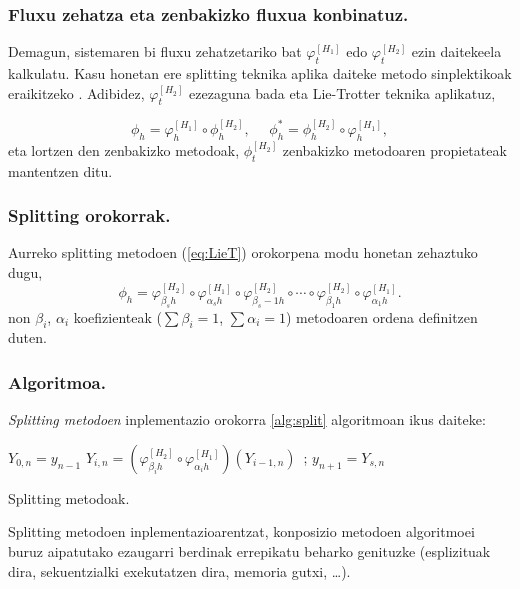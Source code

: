 \subsubsection*{Fluxu zehatza eta zenbakizko fluxua konbinatuz.}
Demagun, sistemaren bi fluxu zehatzetariko bat $\varphi_t^{[H_1]}$ edo $\varphi_t^{[H_2]}$ ezin daitekeela kalkulatu. Kasu honetan ere splitting teknika aplika daiteke  metodo sinplektikoak eraikitzeko . Adibidez, $\varphi_t^{[H_2]}$ ezezaguna bada eta Lie-Trotter teknika aplikatuz,

\begin{equation*}
\phi_h=\varphi_h^{[H_1]} \circ \phi_h^{[H_2]}, \ \ \ \ \ \  \phi_h^{*}=\phi_h^{[H_2]} \circ \varphi_h^{[H_1]},
\end{equation*}
%
eta lortzen den zenbakizko metodoak, $\phi_t^{[H_2]}$ zenbakizko metodoaren propietateak mantentzen ditu. 

\subsubsection*{Splitting orokorrak.}

Aurreko splitting metodoen (\ref{eq:LieT}) orokorpena modu honetan zehaztuko dugu,
\begin{equation}
\phi_h = \varphi_{\beta_s h}^{[H_2]} \circ \varphi_{\alpha_s h}^{[H_1]} \circ \varphi_{\beta_s-1 h}^{[H_2]} 
\circ \cdots \circ \varphi_{\beta_1 h}^{[H_2]} \circ \varphi_{\alpha_1 h}^{[H_1]} .
\end{equation}
%
non $\beta_i$, $\alpha_i$ koefizienteak ($\sum \beta_i=1$, $\sum \alpha_i=1$) metodoaren ordena definitzen duten.


\subsubsection*{Algoritmoa.}

\emph{Splitting metodoen} inplementazio orokorra \ref{alg:split} algoritmoan ikus daiteke:

\begin{algorithm}[H]
 \BlankLine
  {
   \BlankLine
    $Y_{0,n}=y_{n-1} $\;
    \BlankLine
   {
    \BlankLine 
    $Y_{i,n}=(\varphi^{[H_2]}_{\beta_i h} \circ \varphi^{[H_1]}_{\alpha_i h})(Y_{i-1,n})$\ ;
   }
   \BlankLine
    $y_{n+1}=Y_{s,n}$\;
   \BlankLine
 }
 \caption{Splitting metodoak.}
 \label{alg:split}
\end{algorithm}

Splitting metodoen inplementazioarentzat, konposizio metodoen algoritmoei buruz aipatutako ezaugarri berdinak errepikatu beharko genituzke (esplizituak dira, sekuentzialki exekutatzen dira, memoria gutxi, \dots). 

